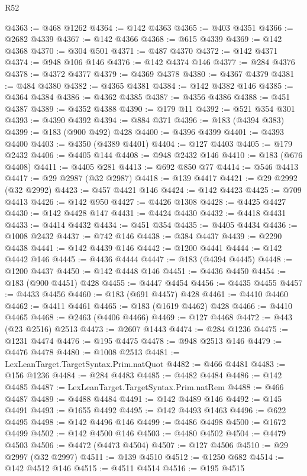 \begin{lexlean}{R52}
\begin{coremodule}
{{{{{{{{{{{{{{{{{{{{{{{{{{{{{{{{{{{{{{{{{{{{{{{{{{{{{{{{{{{{{{{{{{{{{{{{{{{{{{{{{{{{{{{{{{{{{{{{{{{{{{{{{{{{{{{{{{{{{{{{{{{{{{{{{{{{{{{{{{{{{{{{{{{{{{{{{{{{{{{{{{{{{{{{{{{{{{{{{{{{{{{{{{{{{{{{{{{{{{@4363 := @468 @1262
@4364 := @142 @4363
@4365 := @403 @4351
@4366 := @2682 @4339
@4367 := @142 @4366
@4368 := @615 @4339
@4369 := @142 @4368
@4370 := @304 @501
@4371 := @487 @4370
@4372 := @142 @4371
@4374 := @948 @106 @146
@4376 := @142 @4374 @146
@4377 := @284 @4376
@4378 := @4372 @4377
@4379 := @4369 @4378
@4380 := @4367 @4379
@4381 := @484 @4380
@4382 := @4365 @4381
@4384 := @142 @4382 @146
@4385 := @4364 @4384
@4386 := @4362 @4385
@4387 := @4356 @4386
@4388 := @451 @4387
@4389 := @4352 @4388
@4390 := @179 @11
@4392 := @521 @354 @301
@4393 := @4390 @4392
@4394 := @884 @371
@4396 := @183 (@4394 @383)
@4399 := @183 (@900 @492) @428
@4400 := @4396 @4399
@4401 := @4393 @4400
@4403 := @4350 (@4389 @4401)
@4404 := @127 @4403
@4405 := @179 @2432
@4406 := @4405 @144
@4408 := @948 @2432 @146
@4410 := @183 (@676 @4408)
@4411 := @4405 @281
@4413 := @692 @850 @77
@4414 := @546 @4413
@4417 := @29 @2987 (@32 @2987)
@4418 := @139 @4417
@4421 := @29 @2992 (@32 @2992)
@4423 := @457 @4421 @146
@4424 := @142 @4423
@4425 := @709 @4413
@4426 := @142 @950
@4427 := @4426 @1308
@4428 := @4425 @4427
@4430 := @142 @4428 @147
@4431 := @4424 @4430
@4432 := @4418 @4431
@4433 := @4414 @4432
@4434 := @451 @354
@4435 := @4405 @4434
@4436 := @1008 @2432
@4437 := @742 @146
@4438 := @384 @4437
@4439 := @2290 @4438
@4441 := @142 @4439 @146
@4442 := @1200 @4441
@4444 := @142 @4442 @146
@4445 := @4436 @4444
@4447 := @183 (@4394 @4445)
@4448 := @1200 @4437
@4450 := @142 @4448 @146
@4451 := @4436 @4450
@4454 := @183 (@900 @4451) @428
@4455 := @4447 @4454
@4456 := @4435 @4455
@4457 := @4433 @4456
@4460 := @183 (@691 @4457) @428
@4461 := @4410 @4460
@4462 := @4411 @4461
@4465 := @183 (@1619 @4462) @428
@4466 := @4410 @4465
@4468 := @2463 (@4406 @4466)
@4469 := @127 @4468
@4472 := @443 (@23 @2516) @2513
@4473 := @2607 @1443
@4474 := @284 @1236
@4475 := @1231 @4474
@4476 := @195 @4475
@4478 := @948 @2513 @146
@4479 := @4476 @4478
@4480 := @1008 @2513
@4481 := LexLeanTarget.TargetSyntax.Prim.natQuot
@4482 := @466 @4481
@4483 := @156 @1236
@4484 := @284 @4483
@4485 := @4482 @4484
@4486 := @142 @4485
@4487 := LexLeanTarget.TargetSyntax.Prim.natRem
@4488 := @466 @4487
@4489 := @4488 @4484
@4491 := @142 @4489 @146
@4492 := @145 @4491
@4493 := @1655 @4492
@4495 := @142 @4493 @1463
@4496 := @622 @4495
@4498 := @142 @4496 @146
@4499 := @4486 @4498
@4500 := @1672 @4499
@4502 := @142 @4500 @146
@4503 := @4480 @4502
@4504 := @4479 @4503
@4506 := @4472 (@4473 @4504)
@4507 := @127 @4506
@4510 := @29 @2997 (@32 @2997)
@4511 := @139 @4510
@4512 := @1250 @682
@4514 := @142 @4512 @146
@4515 := @4511 @4514
@4516 := @195 @4515
}}}}}}}}}}}}}}}}}}}}}}}}}}}}}}}}}}}}}}}}}}}}}}}}}}}}}}}}}}}}}}}}}}}}}}}}}}}}}}}}}}}}}}}}}}}}}}}}}}}}}}}}}}}}}}}}}}}}}}}}}}}}}}}}}}}}}}}}}}}}}}}}}}}}}}}}}}}}}}}}}}}}}}}}}}}}}}}}}}}}}}}}}}}}}}}}}}}}}}
\end{coremodule}
\end{lexlean}

